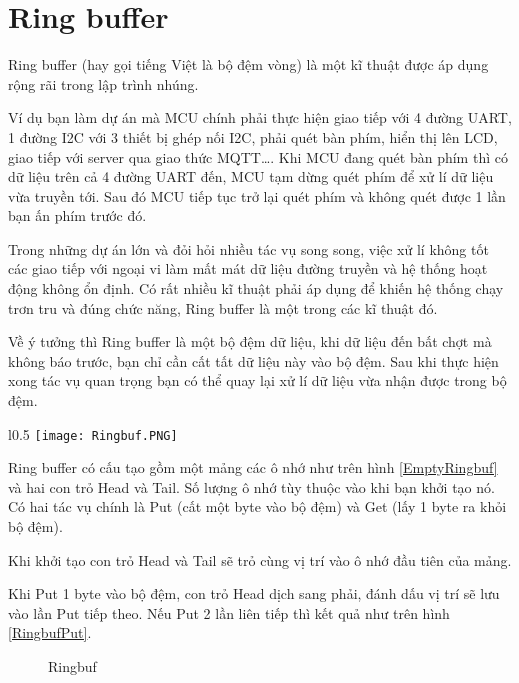 \newpage
\section{Ring buffer}

Ring buffer (hay gọi tiếng Việt là bộ đệm vòng) là một kĩ thuật được áp dụng rộng rãi trong lập trình nhúng.

Ví dụ bạn làm dự án mà MCU chính phải thực hiện giao tiếp với 4 đường UART, 1 đường I2C với 3 thiết bị ghép nối I2C, phải quét bàn phím, hiển thị lên LCD, giao tiếp với server qua giao thức MQTT\dots. Khi MCU đang quét bàn phím thì có dữ liệu trên cả 4 đường UART đến, MCU tạm dừng quét phím để xử lí dữ liệu vừa truyền tới. Sau đó MCU tiếp tục trở lại quét phím và không quét được 1 lần bạn ấn phím trước đó.

Trong những dự án lớn và đỏi hỏi nhiều tác vụ song song, việc xử lí không tốt các giao tiếp với ngoại vi làm mất mát dữ liệu đường truyền và hệ thống hoạt động không ổn định. Có rất nhiều kĩ thuật phải áp dụng để khiến hệ thống chạy trơn tru và đúng chức năng, Ring buffer là một trong các kĩ thuật đó.

Về ý tưởng thì Ring buffer là một bộ đệm dữ liệu, khi dữ liệu đến bất chợt mà không báo trước, bạn chỉ cần cất tất dữ liệu này vào bộ đệm. Sau khi thực hiện xong tác vụ quan trọng bạn có thể quay lại xử lí dữ liệu vừa nhận được trong bộ đệm.

\begin{wrapfigure}{l}{0.5\textwidth}
	\centering
    \texttt{[image: Ringbuf.PNG]}
\caption{Ringbuf empty}
\label{EmptyRingbuf}
\end{wrapfigure}

Ring buffer có cấu tạo gồm một mảng các ô nhớ như trên hình \ref{EmptyRingbuf} và hai con trỏ Head và Tail. Số lượng ô nhớ tùy thuộc vào khi bạn khởi tạo nó. Có hai tác vụ chính là Put (cất một byte vào bộ đệm) và Get (lấy 1 byte ra khỏi bộ đệm).

Khi khởi tạo con trỏ Head và Tail sẽ trỏ cùng vị trí vào ô nhớ đầu tiên của mảng.

Khi Put 1 byte vào bộ đệm, con trỏ Head dịch sang phải, đánh dấu vị trí sẽ lưu vào lần Put tiếp theo. Nếu Put 2 lần liên tiếp thì kết quả như trên hình \ref{RingbufPut}.

\begin{figure}[h!]
    \centering
    \caption{Ringbuf}
\end{figure}

